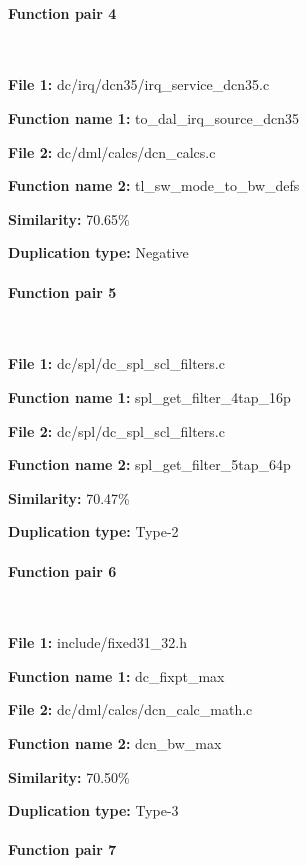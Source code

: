 \paragraph{Function pair 4 }  

\

\textbf{File 1:} dc/irq/dcn35/irq\_service\_dcn35.c

\textbf{Function name 1:} to\_dal\_irq\_source\_dcn35

\textbf{File 2:} dc/dml/calcs/dcn\_calcs.c

\textbf{Function name 2:} tl\_sw\_mode\_to\_bw\_defs

\textbf{Similarity:} 70.65\%

\textbf{Duplication type:} Negative


\paragraph{Function pair 5 }  

\

\textbf{File 1:} dc/spl/dc\_spl\_scl\_filters.c

\textbf{Function name 1:} spl\_get\_filter\_4tap\_16p

\textbf{File 2:} dc/spl/dc\_spl\_scl\_filters.c

\textbf{Function name 2:} spl\_get\_filter\_5tap\_64p

\textbf{Similarity:} 70.47\%

\textbf{Duplication type:} Type-2


\paragraph{Function pair 6 }  

\

\textbf{File 1:} include/fixed31\_32.h

\textbf{Function name 1:} dc\_fixpt\_max

\textbf{File 2:} dc/dml/calcs/dcn\_calc\_math.c

\textbf{Function name 2:} dcn\_bw\_max

\textbf{Similarity:} 70.50\%

\textbf{Duplication type:} Type-3


\paragraph{Function pair 7 }  

\

